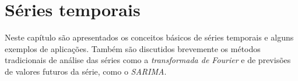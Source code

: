 
\chapter{Séries temporais}
\label{cap:series}

Neste capítulo são apresentados os conceitos básicos de séries temporais e alguns exemplos de aplicações. Também são discutidos brevemente os métodos tradicionais de análise das séries como a \emph{transformada de Fourier} e de previsões de valores futuros da série, como o \emph{SARIMA}.
